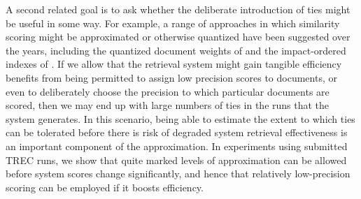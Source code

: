A second related goal is to ask whether the deliberate introduction
of ties might be useful in some way.
For example, a range of approaches in which similarity scoring might
be approximated or otherwise quantized have been suggested over the
years, including the quantized document weights of {\citet{mzs94ipm}}
and the impact-ordered indexes of {\citet{am06sigir}}.
If we allow that the retrieval system might gain tangible efficiency
benefits from being permitted to assign low precision scores to
documents, or even to deliberately choose the precision to which
particular documents are scored, then we may end up with large
numbers of ties in the runs that the system generates.
In this scenario, being able to estimate the extent to which ties can
be tolerated before there is risk of degraded system retrieval
effectiveness is an important component of the approximation.
In experiments using submitted TREC runs, we show that quite marked
levels of approximation can be allowed before system scores change
significantly, and hence that relatively low-precision scoring can be
employed if it boosts efficiency.

